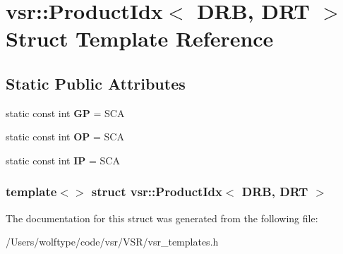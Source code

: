 \hypertarget{structvsr_1_1_product_idx_3_01_d_r_b_00_01_d_r_t_01_4}{\section{vsr\-:\-:Product\-Idx$<$ D\-R\-B, D\-R\-T $>$ Struct Template Reference}
\label{structvsr_1_1_product_idx_3_01_d_r_b_00_01_d_r_t_01_4}
}
\subsection*{Static Public Attributes}
\begin{DoxyCompactItemize}
\item 
\hypertarget{structvsr_1_1_product_idx_3_01_d_r_b_00_01_d_r_t_01_4_acf92338be5b08bc7aae102972827b069}{static const int {\bfseries G\-P} = S\-C\-A}\label{structvsr_1_1_product_idx_3_01_d_r_b_00_01_d_r_t_01_4_acf92338be5b08bc7aae102972827b069}

\item 
\hypertarget{structvsr_1_1_product_idx_3_01_d_r_b_00_01_d_r_t_01_4_a3dac1ecc3fdd79074aedc1d8df559d2c}{static const int {\bfseries O\-P} = S\-C\-A}\label{structvsr_1_1_product_idx_3_01_d_r_b_00_01_d_r_t_01_4_a3dac1ecc3fdd79074aedc1d8df559d2c}

\item 
\hypertarget{structvsr_1_1_product_idx_3_01_d_r_b_00_01_d_r_t_01_4_aa13ad3fd3bb17ae3e1ee58c28afe5b6e}{static const int {\bfseries I\-P} = S\-C\-A}\label{structvsr_1_1_product_idx_3_01_d_r_b_00_01_d_r_t_01_4_aa13ad3fd3bb17ae3e1ee58c28afe5b6e}

\end{DoxyCompactItemize}
\subsubsection*{template$<$$>$ struct vsr\-::\-Product\-Idx$<$ D\-R\-B, D\-R\-T $>$}



The documentation for this struct was generated from the following file\-:\begin{DoxyCompactItemize}
\item 
/\-Users/wolftype/code/vsr/\-V\-S\-R/vsr\-\_\-templates.\-h\end{DoxyCompactItemize}
